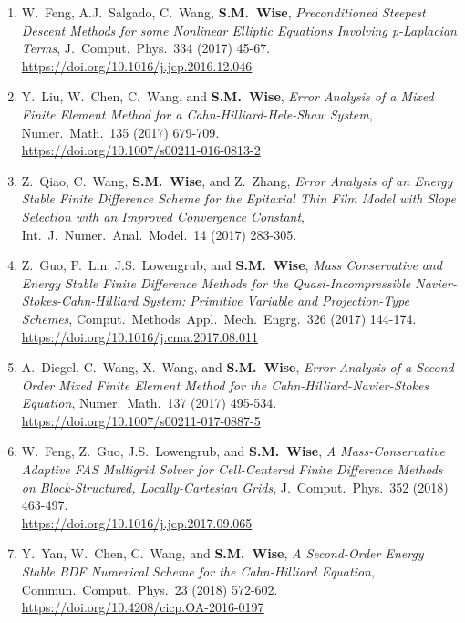 \documentclass[11pt]{letter}
\begin{document}
\begin{enumerate}
	\item
W.~Feng, A.J.~Salgado, C.~Wang, \textbf{S.M.~Wise}, {\sl Preconditioned Steepest Descent Methods for some Nonlinear Elliptic Equations Involving p-Laplacian Terms}, J.~Comput.~Phys.~334 (2017) 45-67.
	\\ 
\url{https://doi.org/10.1016/j.jcp.2016.12.046}

	\item
Y.~Liu, W.~Chen, C.~Wang, and \textbf{S.M.~Wise}, {\sl Error Analysis of a Mixed Finite Element Method for a Cahn-Hilliard-Hele-Shaw System}, Numer.~Math.~135 (2017) 679-709.
	\\ 
\url{https://doi.org/10.1007/s00211-016-0813-2}

	\item
Z.~Qiao, C.~Wang, \textbf{S.M.~Wise}, and Z.~Zhang, {\sl Error Analysis of an Energy Stable Finite Difference Scheme for the Epitaxial Thin Film Model with Slope Selection with an Improved Convergence Constant}, Int.~J.~Numer.~Anal.~Model.~14 (2017) 283-305.

	\item
Z.~Guo, P.~Lin, J.S.~Lowengrub, and \textbf{S.M.~Wise}, {\sl Mass Conservative and Energy Stable Finite Difference Methods for the Quasi-Incompressible Navier-Stokes-Cahn-Hilliard System: Primitive Variable and Projection-Type Schemes}, Comput.~Methods~Appl.~Mech.~Engrg.~326 (2017) 144-174.
	\\ 
\url{https://doi.org/10.1016/j.cma.2017.08.011}

	\item
A.~Diegel, C.~Wang, X.~Wang, and \textbf{S.M.~Wise}, {\sl Error Analysis of a Second Order Mixed Finite Element Method for the Cahn-Hilliard-Navier-Stokes Equation}, Numer.~Math.~137 (2017) 495-534.
	\\ 
\url{https://doi.org/10.1007/s00211-017-0887-5}

	\item
W.~Feng, Z.~Guo, J.S.~Lowengrub, and \textbf{S.M.~Wise}, {\sl A Mass-Conservative Adaptive FAS Multigrid Solver for Cell-Centered Finite Difference Methods on Block-Structured, Locally-Cartesian Grids}, J.~Comput.~Phys.~352 (2018) 463-497.
	\\ 
\url{https://doi.org/10.1016/j.jcp.2017.09.065}

	\item
Y.~Yan, W.~Chen, C.~Wang, and \textbf{S.M.~Wise}, {\sl A Second-Order Energy Stable BDF Numerical Scheme for the Cahn-Hilliard Equation}, Commun.~Comput.~Phys.~23 (2018) 572-602.
	\\ 
\url{https://doi.org/10.4208/cicp.OA-2016-0197}



\end{enumerate}
\end{document}
